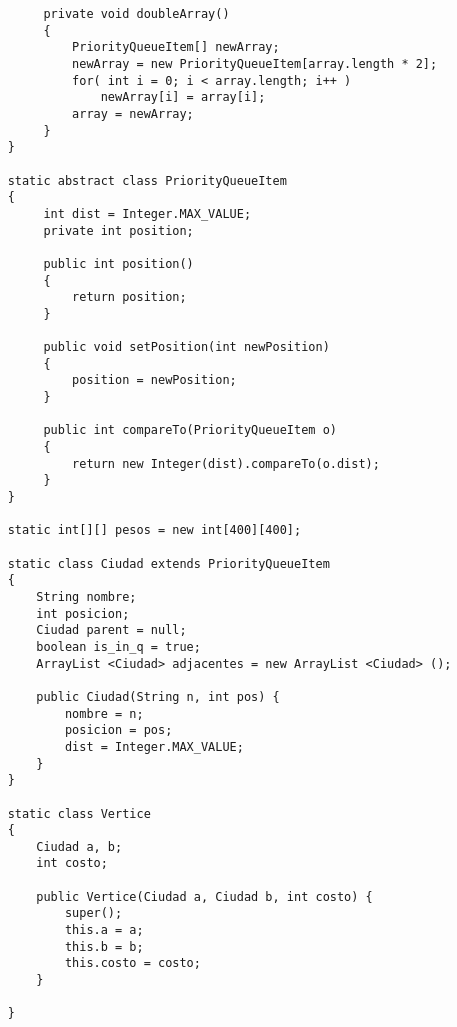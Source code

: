 \documentclass[a4paper, 11pt, oneside]{report}
\begin{document}
\begin{verbatim}
	     private void doubleArray()  
	     {
	         PriorityQueueItem[] newArray;
	         newArray = new PriorityQueueItem[array.length * 2];
	         for( int i = 0; i < array.length; i++ )
	             newArray[i] = array[i];
	         array = newArray;
	     }
	}
	
	static abstract class PriorityQueueItem
	{
	     int dist = Integer.MAX_VALUE;
	     private int position;

	     public int position()
	     {
	         return position;
	     }

	     public void setPosition(int newPosition)
	     {
	         position = newPosition;
	     }

	     public int compareTo(PriorityQueueItem o)
	     {
	         return new Integer(dist).compareTo(o.dist);
	     }
	}
	
	static int[][] pesos = new int[400][400];
	
	static class Ciudad extends PriorityQueueItem
	{
		String nombre;
		int posicion;
		Ciudad parent = null;
		boolean is_in_q = true;
		ArrayList <Ciudad> adjacentes = new ArrayList <Ciudad> ();
		
		public Ciudad(String n, int pos) {
			nombre = n;
			posicion = pos;
			dist = Integer.MAX_VALUE;
		}
	}
	
	static class Vertice
	{
		Ciudad a, b;
		int costo;
		
		public Vertice(Ciudad a, Ciudad b, int costo) {
			super();
			this.a = a;
			this.b = b;
			this.costo = costo;
		}
		
	}
	

\end{verbatim}
\end{document}
